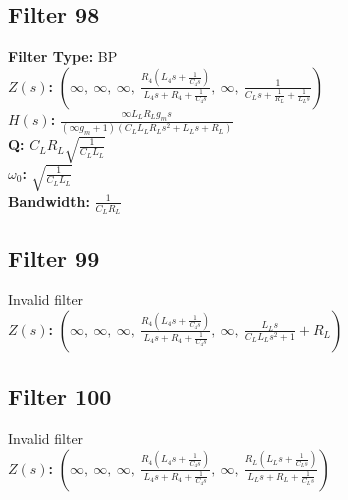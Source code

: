 \documentclass{article}
\begin{document}
\subsection*{Filter 98}
\textbf{Filter Type:} BP \\ 
\textbf{$Z(s)$:} $\left( \infty, \  \infty, \  \infty, \  \frac{R_{4} \left(L_{4} s + \frac{1}{C_{4} s}\right)}{L_{4} s + R_{4} + \frac{1}{C_{4} s}}, \  \infty, \  \frac{1}{C_{L} s + \frac{1}{R_{L}} + \frac{1}{L_{L} s}}\right)$ \\ 
\textbf{$H(s)$:} $\frac{\infty L_{L} R_{L} g_{m} s}{\left(\infty g_{m} + 1\right) \left(C_{L} L_{L} R_{L} s^{2} + L_{L} s + R_{L}\right)}$ \\ 
\textbf{Q:} $C_{L} R_{L} \sqrt{\frac{1}{C_{L} L_{L}}}$ \\ 
\textbf{$\omega_0$:} $\sqrt{\frac{1}{C_{L} L_{L}}}$ \\ 
\textbf{Bandwidth:} $\frac{1}{C_{L} R_{L}}$ \\ 
\subsection*{Filter 99}
Invalid filter \\ 
\textbf{$Z(s)$:} $\left( \infty, \  \infty, \  \infty, \  \frac{R_{4} \left(L_{4} s + \frac{1}{C_{4} s}\right)}{L_{4} s + R_{4} + \frac{1}{C_{4} s}}, \  \infty, \  \frac{L_{L} s}{C_{L} L_{L} s^{2} + 1} + R_{L}\right)$ \\ 
\subsection*{Filter 100}
Invalid filter \\ 
\textbf{$Z(s)$:} $\left( \infty, \  \infty, \  \infty, \  \frac{R_{4} \left(L_{4} s + \frac{1}{C_{4} s}\right)}{L_{4} s + R_{4} + \frac{1}{C_{4} s}}, \  \infty, \  \frac{R_{L} \left(L_{L} s + \frac{1}{C_{L} s}\right)}{L_{L} s + R_{L} + \frac{1}{C_{L} s}}\right)$ \\ 
\end{document}
